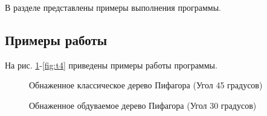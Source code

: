 \documentclass[a4paper,12pt]{article}
\begin{document}
	В разделе представлены примеры выполнения программы.
	
	\subsection{Примеры работы}
	
	На рис. \ref{fig:t0}-\ref{fig:t4} приведены примеры работы программы. 
	
	\begin{figure}[h!]
		\caption{
			Обнаженное классическое дерево Пифагора (Угол 45 градусов)}
		\label{fig:t0}
	\end{figure}

\newpage
	
	\begin{figure}[h!]
		\caption{
			Обнаженное обдуваемое дерево Пифагора (Угол 30 градусов)}
		\label{fig:t1}
	\end{figure}
	
\end{document}

